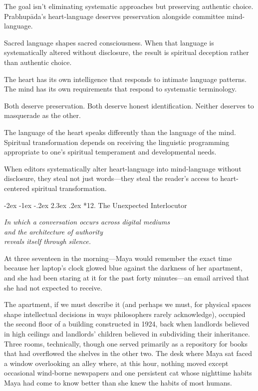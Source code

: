 \documentclass[12pt,twoside]{book}
\makeatletter
\def\cleardoublepage{\clearpage\if@twoside \ifodd\c@page\else\hbox{}\thispagestyle{empty}\newpage\if@twocolumn\hbox{}\newpage\fi\fi\fi}
\renewcommand\section{\@startsection{section}{1}{\z@}%
{-2ex \@plus -1ex \@minus -.2ex}%
{2.3ex \@plus.2ex}%
{\normalfont\Large\bfseries}}
\makeatother
\begin{document}
The goal isn't eliminating systematic approaches but preserving authentic choice. Prabhupāda's heart-language deserves preservation alongside committee mind-language.

Sacred language shapes sacred consciousness. When that language is systematically altered without disclosure, the result is spiritual deception rather than authentic choice.

The heart has its own intelligence that responds to intimate language patterns. The mind has its own requirements that respond to systematic terminology.

Both deserve preservation. Both deserve honest identification. Neither deserves to masquerade as the other.

The language of the heart speaks differently than the language of the mind. Spiritual transformation depends on receiving the linguistic programming appropriate to one's spiritual temperament and developmental needs.

When editors systematically alter heart-language into mind-language without disclosure, they steal not just words—they steal the reader's access to heart-centered spiritual transformation.

\cleardoublepage
\vspace*{0.20\textheight}
\section*{12. The Unexpected Interlocutor}
\thispagestyle{chapterpage}

{\centering\itshape In which a conversation occurs across digital mediums\\and the architecture of authority\\reveals itself through silence.\par}
\vspace{0.3cm}

\normalfont\justifying
At three seventeen in the morning—Maya would remember the exact time because her laptop's clock glowed blue against the darkness of her apartment, and she had been staring at it for the past forty minutes—an email arrived that she had not expected to receive.

The apartment, if we must describe it (and perhaps we must, for physical spaces shape intellectual decisions in ways philosophers rarely acknowledge), occupied the second floor of a building constructed in 1924, back when landlords believed in high ceilings and landlords' children believed in subdividing their inheritance. Three rooms, technically, though one served primarily as a repository for books that had overflowed the shelves in the other two. The desk where Maya sat faced a window overlooking an alley where, at this hour, nothing moved except occasional wind-borne newspapers and one persistent cat whose nighttime habits Maya had come to know better than she knew the habits of most humans.
\end{document}
